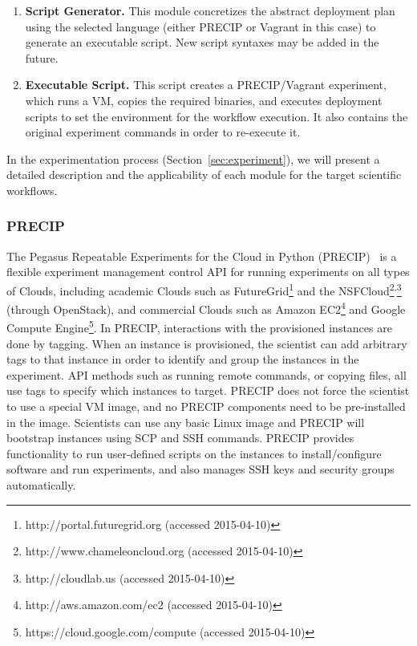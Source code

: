\begin{enumerate}
	\item \textbf{Script Generator.} This module concretizes the abstract deployment plan using the selected
		language (either PRECIP or Vagrant in this case) to generate an executable script. New script syntaxes 
		may be added in the future.

	\item \textbf{Executable Script.} This script creates a PRECIP/Vagrant experiment, which runs a VM, 
		copies the required binaries, and executes deployment scripts to set the environment for the 
		workflow execution. It also contains the original experiment commands in order to 
		re-execute it.

\end{enumerate}

In the experimentation process (Section~\ref{sec:experiment}), we will present a detailed description 
and the applicability of each module for the target scientific workflows.



\subsubsection{PRECIP}
The Pegasus Repeatable Experiments for the Cloud in Python (PRECIP)~\cite{Azarnoosh-CRC-2013} 
is a flexible experiment management control API for running experiments on all types of Clouds, 
including academic Clouds such as FutureGrid\footnote{http://portal.futuregrid.org (accessed 2015-04-10)} and the NSFCloud\footnote{http://www.chameleoncloud.org (accessed 2015-04-10)}\textsuperscript{,}\footnote{http://cloudlab.us (accessed 2015-04-10)}
(through OpenStack), and commercial Clouds such as Amazon EC2\footnote{http://aws.amazon.com/ec2 (accessed 2015-04-10)} and Google Compute Engine\footnote{https://cloud.google.com/compute (accessed 2015-04-10)}. In PRECIP, interactions with the provisioned instances are done by 
tagging. When an instance is provisioned, the scientist can add arbitrary tags to that instance in 
order to identify and group the instances in the experiment. API methods such as running remote 
commands, or copying files, all use tags to specify which instances to target. PRECIP does not 
force the scientist to use a special VM image, and no PRECIP components need to be pre-installed 
in the image. Scientists can use any basic Linux image and PRECIP will bootstrap instances using 
SCP and SSH commands. PRECIP provides functionality to run user-defined scripts on the instances 
to install/configure software and run experiments, and also manages SSH keys and security groups 
automatically.

